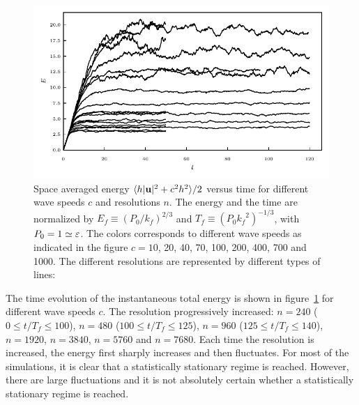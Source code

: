 \begin{figure}
\centerline{\includegraphics[width=13cm]{../Pyfig/fig_Emean_time}}
\caption{Space averaged energy 
$\langle h|\textbf{u}|^2 + c^2 h^2 \rangle/2$ versus time 
for different wave speeds $c$ and resolutions $n$.
%
The energy and the time are normalized by 
$E_f\equiv (P_0/k_f)^{2/3}$ and $T_f\equiv (P_0 {k_f}^2)^{-1/3}$,
with $P_0 = 1 \simeq \varepsilon$.
%
The colors corresponds to different wave speeds as indicated in the figure
$c= 10$, 20, 40, 70, 100, 200, 400, 700 and 1000.
%
The different resolutions are represented by different types of lines:
}
\label{fig_Evstime}
\end{figure}






The time evolution of the instantaneous total energy is shown in
figure~\ref{fig_Evstime} for different wave speeds $c$.
%
The resolution  progressively
increased: %
$n = 240$ ($0\leqslant t/T_f \leqslant 100$), %
$n = 480$ ($100\leqslant t/T_f \leqslant 125$), %
$n = 960$ ($125\leqslant t/T_f \leqslant 140$), %
$n = 1920$, %
$n = 3840$, %
$n = 5760$ and %
$n = 7680$.
%
Each time the resolution is increased, the energy first sharply
increases and then fluctuates.  For most of the simulations, it is
clear that a statistically stationary regime is reached.
%
However, 
%
%
%
there are large fluctuations and it is not absolutely certain whether
a statistically stationary regime is reached.
%
%


